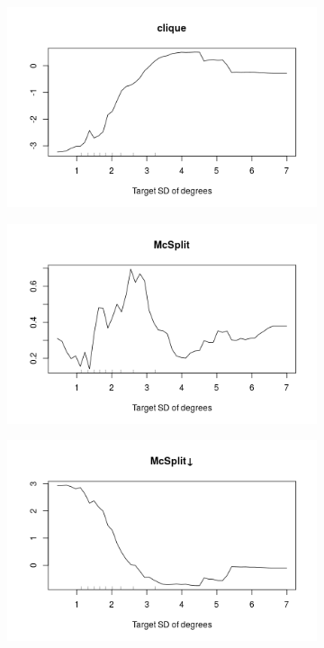 \documentclass{l4proj}
\theoremstyle{definition}
\theoremstyle{remark}
\begin{document}
\begin{figure}
  \centering
  \begin{subfigure}[t]{0.49\textwidth}
    \centering
    \includegraphics[width=\textwidth]{images/_both_labels_clique_stddeg.png}
  \end{subfigure}
  \begin{subfigure}[t]{0.49\textwidth}
    \centering
    \includegraphics[width=\textwidth]{images/_both_labels_mcsplit_stddeg.png}
  \end{subfigure}
  \begin{subfigure}[t]{0.49\textwidth}
    \centering
    \includegraphics[width=\textwidth]{images/_both_labels_mcsplitdown_stddeg.png}

\end{subfigure}
\end{figure}
\end{document}
